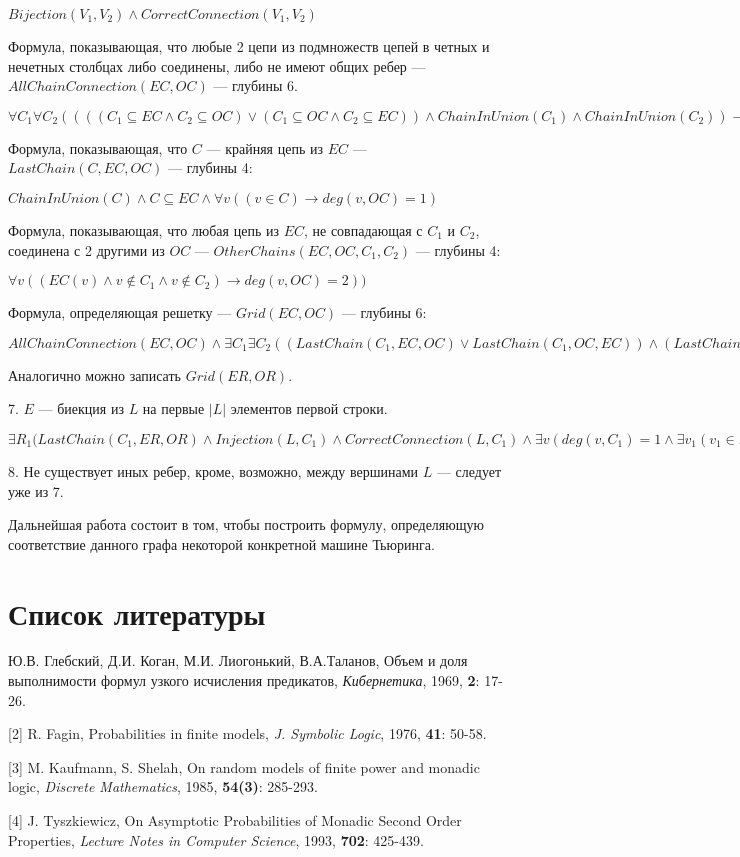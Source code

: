 \documentclass{article}
\begin{document}
$Bijection(V_1, V_2) \land CorrectConnection(V_1, V_2)$

Формула, показывающая, что любые 2 цепи из подмножеств цепей в четных и нечетных
столбцах либо соединены, либо не имеют общих ребер --- $AllChainConnection(EC, OC)$ --- глубины 6.

$\forall C_1 \forall C_2 ((((C_1 \subseteq EC \land C_2 \subseteq OC)
\lor (C_1 \subseteq OC \land C_2 \subseteq EC)) \land ChainInUnion(C_1) \land ChainInUnion(C_2)) \rightarrow (Connected(C_1, C_2) \lor (\forall v (v \in C_1 \rightarrow deg(v, C_2) = 0)))))$

Формула, показывающая, что $C$ --- крайняя цепь из $EC$ --- $LastChain(C, EC, OC)$ ---
глубины 4:

$ChainInUnion(C) \land C \subseteq EC \land \forall v ((v \in C) \rightarrow deg(v, OC) = 1)$

Формула, показывающая, что любая цепь из $EC$, не совпадающая с $C_1$ и $C_2$, соединена с 2 другими из $OC$ --- $OtherChains(EC, OC, C_1, C_2)$ --- глубины 4:

$\forall v ((EC(v) \land v \notin C_1 \land v \notin C_2) \rightarrow deg(v, OC) = 2))$

Формула, определяющая решетку --- $Grid(EC, OC)$ --- глубины 6:

$AllChainConnection(EC, OC) \land \exists C_1 \exists C_2 ((LastChain(C_1, EC, OC) \lor
LastChain(C_1, OC, EC)) \land (LastChain(C_2, EC, OC) \lor LastChain(C_2, OC, EC)) \land
OtherChains(EC, OC, C_1, C_2) \land OtherChains(OC, EC, C_1, C_2))$

Аналогично можно записать $Grid(ER, OR)$.

7. $E$ --- биекция из $L$ на первые $|L|$ элементов первой строки.

$\exists R_1 (LastChain(C_1, ER, OR) \land Injection(L, C_1) \land
CorrectConnection(L, C_1) \land \exists v (deg (v, C_1) = 1 \land \exists v_1( v_1 \in L \land v_1 \sim v))$

8. Не существует иных ребер, кроме, возможно, между вершинами $L$ ---
следует уже из 7.
 
Дальнейшая работа состоит в том, чтобы построить формулу, определяющую соответствие данного графа некоторой конкретной машине Тьюринга.

\section{Список литературы}

\quad \enspace  [1] Ю.В. Глебский, Д.И. Коган, М.И. Лиогонький, В.А.Таланов, Объем и доля выполнимости формул узкого исчисления предикатов, \textit{Кибернетика}, 1969, \textbf{2}: 17-26.

[2] R. Fagin, Probabilities in finite models, \textit{J. Symbolic Logic}, 1976, \textbf{41}: 50-58.

[3] M. Kaufmann, S. Shelah, On random models of finite power and monadic logic, \textit{Discrete Mathematics}, 1985, \textbf{54(3)}: 285-293.

[4] J. Tyszkiewicz, On Asymptotic Probabilities of Monadic Second Order Properties, \textit{Lecture Notes in Computer Science}, 1993, \textbf{702}: 425-439.
\end{document}
